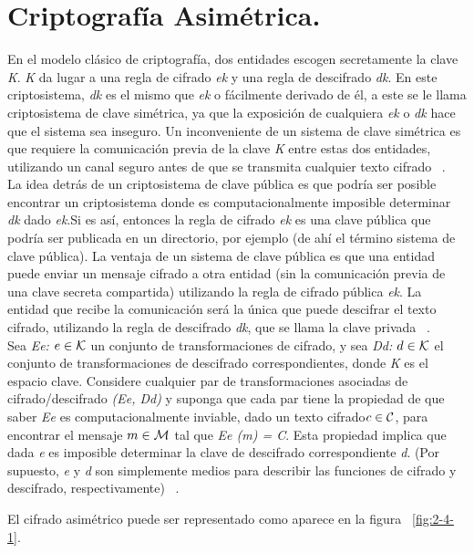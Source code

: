 \section{Criptografía Asimétrica. }
En el modelo clásico de criptografía, dos entidades escogen secretamente la clave \textit{K}. \textit{K} da lugar a una regla de cifrado \textit{ek} y una regla de descifrado \textit{dk}. En este criptosistema, \textit{dk} es el mismo que \textit{ek} o fácilmente derivado de él, a este se le llama criptosistema de clave simétrica, ya que la exposición de cualquiera \textit{ek} o \textit{dk} hace que el sistema sea inseguro. Un inconveniente de un sistema de clave simétrica es que requiere la comunicación previa de la clave \textit{K} entre estas dos entidades, utilizando un canal seguro antes de que se transmita cualquier texto cifrado ~\cite{stinson}.
\\
La idea detrás de un criptosistema de clave pública es que podría ser posible encontrar un criptosistema donde es computacionalmente imposible determinar \textit{dk} dado \textit{ek}.Si es así, entonces la regla de cifrado \textit{ek} es una clave pública que podría ser publicada en un directorio, por ejemplo (de ahí el término sistema de clave pública). La ventaja de un sistema de clave pública es que una entidad puede enviar un mensaje cifrado a otra entidad (sin la comunicación previa de una clave secreta compartida) utilizando la regla de cifrado pública \textit{ek}. La entidad que recibe la comunicación será la única que puede descifrar el texto cifrado, utilizando la regla de descifrado \textit{dk}, que se llama la clave privada ~\cite{stinson}.
\\ 
Sea  \textit{Ee: $e \in {\cal K}$} un conjunto de transformaciones de cifrado, y sea \textit{Dd: $d \in {\cal K}$} el conjunto de transformaciones de descifrado correspondientes, donde  \textit{K} es el espacio clave. Considere cualquier par de transformaciones asociadas de cifrado/descifrado  \textit{(Ee, Dd)} y suponga que cada par tiene la propiedad de que saber  \textit{Ee} es computacionalmente inviable, dado un texto cifrado$c \in {\cal C}$, para encontrar el mensaje $m \in {\cal M}$ tal que \textit{Ee (m) = C}. Esta propiedad implica que dada \textit{e} es imposible determinar la clave de descifrado correspondiente \textit{d}. (Por supuesto, \textit{e} y \textit{d} son simplemente medios para describir las funciones de cifrado y descifrado, respectivamente) ~\cite{menezes}.

El cifrado asimétrico puede ser representado como aparece en la figura ~\ref{fig:2-4-1}.

